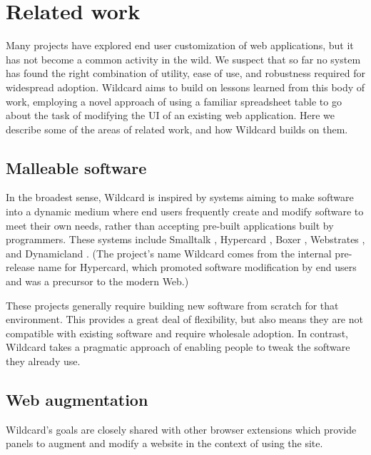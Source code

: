 \documentclass[english,submission]{programming}
\begin{document}
\hypertarget{related-work}{%
\section{Related work}\label{related-work}}

Many projects have explored end user customization of web applications,
but it has not become a common activity in the wild. We suspect that so
far no system has found the right combination of utility, ease of use,
and robustness required for widespread adoption. Wildcard aims to build
on lessons learned from this body of work, employing a novel approach of
using a familiar spreadsheet table to go about the task of modifying the
UI of an existing web application. Here we describe some of the areas of
related work, and how Wildcard builds on them.

\hypertarget{malleable-software}{%
\subsection{Malleable software}\label{malleable-software}}

In the broadest sense, Wildcard is inspired by systems aiming to make
software into a dynamic medium where end users frequently create and
modify software to meet their own needs, rather than accepting pre-built
applications built by programmers. These systems include Smalltalk
\autocite{kay1977}, Hypercard \autocite{hypercard2019}, Boxer
\autocite{disessa1986}, Webstrates \autocite{klokmose2015}, and
Dynamicland \autocite{victor}. (The project's name Wildcard comes from
the internal pre-release name for Hypercard, which promoted software
modification by end users and was a precursor to the modern Web.)

These projects generally require building new software from scratch for
that environment. This provides a great deal of flexibility, but also
means they are not compatible with existing software and require
wholesale adoption. In contrast, Wildcard takes a pragmatic approach of
enabling people to tweak the software they already use.

\hypertarget{web-augmentation}{%
\subsection{Web augmentation}\label{web-augmentation}}

Wildcard's goals are closely shared with other browser extensions which
provide panels to augment and modify a website in the context of using
the site.
\end{document}
